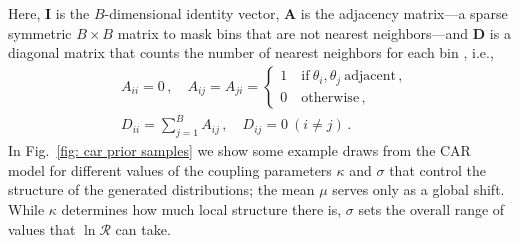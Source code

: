 \documentclass[%
reprint,
 amsmath,amssymb,
 aps,
 prd,nofootinbib,nobibnotes,
 superscriptaddress,groupedaddress,
]{revtex4-2}
\begin{document}
Here, $\mathbf{I}$ is the $B$-dimensional identity vector, $\mathbf{A}$ is the adjacency matrix---a sparse symmetric $B \times B$ matrix to mask bins that are not nearest neighbors---and $\mathbf{D}$ is a diagonal matrix that counts the number of nearest neighbors for each bin \cite{WHITE20093033}, i.e.,
\begin{align}
& A_{ii} = 0
\, , \quad
A_{ij} = A_{ji}
=
\begin{cases}
1 \quad \mathrm{if} \ \theta_i , \theta_j \ \mathrm{adjacent} \, ,
\\
0 \quad \mathrm{otherwise} \, ,
\end{cases}
\label{eq: adjacency matrix}
\\
& D_{ii} = \sum_{j=1}^B A_{ij}
\, , \quad
D_{ij} = 0 \ (i \neq j)
\, .
\label{eq: neighbor matrix}
\end{align}
In Fig.~\ref{fig: car prior samples} we show some example draws from the CAR model for different values of the coupling parameters $\kappa$ and $\sigma$ that control the structure of the generated distributions; the mean $\mu$ serves only as a global shift. While $\kappa$ determines how much local structure there is, $\sigma$ sets the overall range of values that $\ln\mathcal{R}$ can take.
\end{document}
